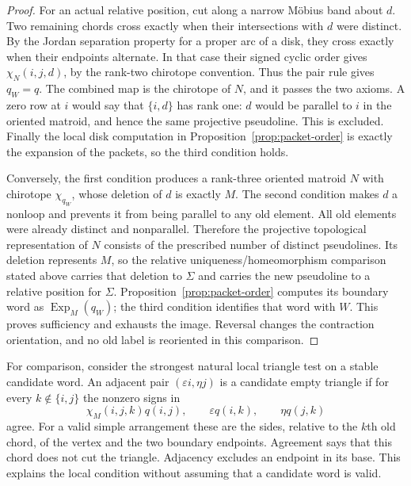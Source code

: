 \begin{proof}

For an actual relative position, cut along a narrow M\"obius band about
$d$.  Two remaining chords cross exactly when their intersections with
$d$ were distinct.  By the Jordan separation property for a proper arc
of a disk, they cross exactly when their endpoints alternate.  In that
case their signed cyclic order gives $\chi_N(i,j,d)$, by the
rank-two chirotope convention.  Thus the pair rule gives $q_W=q$.
The combined map is the chirotope of $N$, and it passes the two axioms.
A zero row at $i$ would say that $\{i,d\}$ has rank one: $d$ would be
parallel to $i$ in the oriented matroid, and hence the same projective
pseudoline.  This is excluded.  Finally the local disk computation in
Proposition~\ref{prop:packet-order} is exactly the expansion of the packets, so the third condition
holds.

Conversely, the first condition produces a rank-three oriented matroid
$N$ with chirotope $\chi_{q_W}$, whose deletion of $d$ is exactly $M$.
The second condition makes $d$ a nonloop and prevents it from being
parallel to any old element.  All old elements were already distinct
and nonparallel.  Therefore the projective topological representation
of $N$ consists of the prescribed number of distinct pseudolines.
Its deletion represents $M$, so the relative uniqueness/homeomorphism
comparison stated above carries that deletion to $\Sigma$ and carries
the new pseudoline to a relative position for $\Sigma$.  Proposition~\ref{prop:packet-order} computes
its boundary word as $\operatorname{Exp}_M(q_W)$; the third condition
identifies that word with $W$.  This proves sufficiency and exhausts
the image.  Reversal changes the contraction orientation, and no old
label is reoriented in this comparison.
\end{proof}

For comparison, consider the strongest natural local triangle test
on a stable candidate word. An adjacent pair
$(\varepsilon i,\eta j)$ is a candidate empty triangle if for every
$k\notin\{i,j\}$ the nonzero signs in
\begin{equation}\label{eq:polygon-triangle}
 \chi_M(i,j,k)q(i,j),\qquad
 \varepsilon q(i,k),\qquad \eta q(j,k)
\end{equation}
agree. For a valid simple arrangement these are the sides, relative
to the $k$th old chord, of the vertex and the two boundary endpoints.
Agreement says that this chord does not cut the triangle. Adjacency
excludes an endpoint in its base. This explains the local condition
without assuming that a candidate word is valid.

